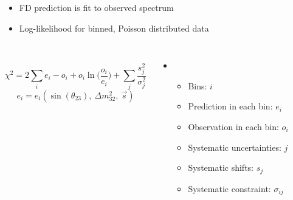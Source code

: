 \documentclass[10pt,professionalfonts,xcolor=table]{beamer}
\begin{document}
\begin{frame}
\begin{itemize}
\item FD prediction is fit to observed spectrum
\item Log-likelihood for binned, Poisson distributed data
\end{itemize}
\begin{columns}[c]
~
\vspace{-5pt}
\begin{equation*}
\chi^2 = 2 \sum_i e_i - o_i + o_i\ln \big (\frac{o_i}{e_i} \big)
+ \sum_j \frac{s_j^2}{\sigma_j^2}
\end{equation*}
\vspace{-5pt}
\begin{equation*}
e_i = e_i(\sin(\theta_{23}), ~\Delta m_{32}^2,~\vec{s} )
\end{equation*}
  \begin{itemize}
  \item[] ~
  \vspace{-15pt}
  \begin{itemize}
  \item Bins: $i$
  \item Prediction in each bin: $e_i$
  \item Observation in each bin: $o_i$
  \item Systematic uncertainties: $j$
  \item Systematic shifts: $s_j$
  \item Systematic constraint: $\sigma_{ij}$
  \end{itemize}
  \end{itemize}
\end{columns}
\end{frame}
\end{document}
